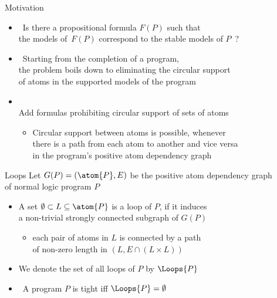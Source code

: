 \begin{frame}{Motivation}
  \begin{itemize}
  \item<1->  \
    Is there a propositional formula $F(P)$ such that\\ the models of~$F(P)$ correspond to the
    stable models of $P$~?
    \bigskip
  \item<2->  \
    Starting from the completion of a program,\\
    the problem boils down to \alert{eliminating the circular support}\\
    of atoms in the supported models of the program
    \bigskip
  \item<3-> \structure{Lin \& Zhao's Idea} \\
    \smallskip
    Add formulas prohibiting circular support of sets of atoms
    \medskip
    \begin{itemize}\normalsize
    \item<4->[\itarrow]
      Circular support between atoms is possible, whenever\\
      there is a path from each atom to another and vice versa\\
      in the program's positive atom dependency graph
    \end{itemize}
  \end{itemize}
\end{frame}
\begin{frame}{Loops}
  \bigskip
  Let $G(P) = (\atom{P},E)$ be the positive atom dependency graph\\ of normal logic program $P$
  \par
  \smallskip
  \begin{itemize}
  \item<2-> A set $\emptyset\subset L \subseteq \atom{P}$ is a \alert{loop} of $P$,
    if it induces\\ a non-trivial strongly connected subgraph of $G(P)$
    \begin{itemize}\normalsize
    \item<3->[\itarrow] each pair of atoms in $L$ is connected by a path\\
      of non-zero length in $(L,E\cap(L \times L))$
    \end{itemize}
    \medskip
  \item<4-> We denote the set of all loops of $P$ by $\Loops{P}$
    \medskip
  \item<5-> \structure{Note} \ A program $P$ is tight iff $\Loops{P}=\emptyset$
  \end{itemize}
\end{frame}
